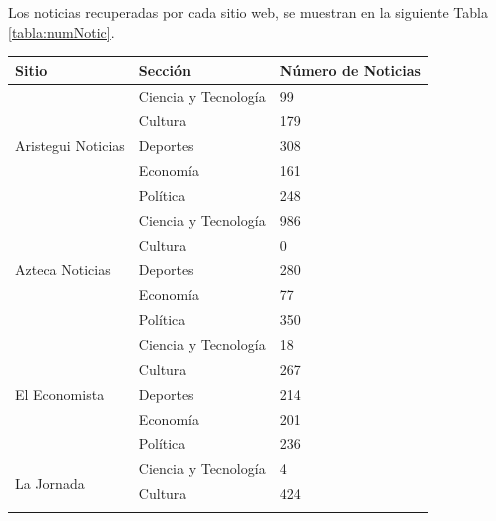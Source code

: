 Los noticias recuperadas por cada sitio web, se muestran en la siguiente Tabla \ref{tabla:numNotic}.

\begin{table}[H]
\begin{tabular}{|l|l|l|}
\hline
Sitio                               & Sección              & Número de Noticias \\ \hline
\multirow{5}{*}{Aristegui Noticias} & Ciencia y Tecnología & 99                 \\ \cline{2-3} 
                                    & Cultura              & 179                \\ \cline{2-3} 
                                    & Deportes             & 308                \\ \cline{2-3} 
                                    & Economía             & 161                \\ \cline{2-3} 
                                    & Política             & 248                \\ \hline
\multirow{5}{*}{Azteca Noticias}    & Ciencia y Tecnología & 986                \\ \cline{2-3} 
                                    & Cultura              & 0                  \\ \cline{2-3} 
                                    & Deportes             & 280                \\ \cline{2-3} 
                                    & Economía             & 77                 \\ \cline{2-3} 
                                    & Política             & 350                \\ \hline
\multirow{5}{*}{El Economista}      & Ciencia y Tecnología & 18                 \\ \cline{2-3} 
                                    & Cultura              & 267                \\ \cline{2-3} 
                                    & Deportes             & 214                \\ \cline{2-3} 
                                    & Economía             & 201                \\ \cline{2-3} 
                                    & Política             & 236                \\ \hline
\multirow{5}{*}{La Jornada}         & Ciencia y Tecnología & 4                  \\ \cline{2-3} 
                                    & Cultura              & 424                \\ \cline{2-3} 

\end{tabular}
\end{table}
